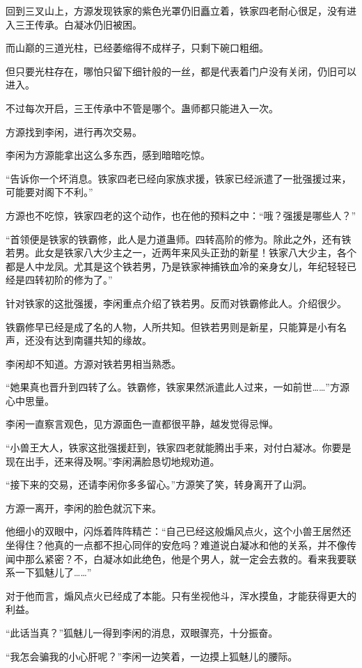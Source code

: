 \begin{this_body}
回到三叉山上，方源发现铁家的紫色光罩仍旧矗立着，铁家四老耐心很足，没有进入三王传承。白凝冰仍旧被困。

而山巅的三道光柱，已经萎缩得不成样子，只剩下碗口粗细。

但只要光柱存在，哪怕只留下细针般的一丝，都是代表着门户没有关闭，仍旧可以进入。

不过每次开启，三王传承中不管是哪个。蛊师都只能进入一次。

方源找到李闲，进行再次交易。

李闲为方源能拿出这么多东西，感到暗暗吃惊。

“告诉你一个坏消息。铁家四老已经向家族求援，铁家已经派遣了一批强援过来，可能要对阁下不利。”

方源也不吃惊，铁家四老的这个动作，也在他的预料之中：“哦？强援是哪些人？”

“首领便是铁家的铁霸修，此人是力道蛊师。四转高阶的修为。除此之外，还有铁若男。此女是铁家八大少主之一，近两年来风头正劲的新星！铁家八大少主，各个都是人中龙凤。尤其是这个铁若男，乃是铁家神捕铁血冷的亲身女儿，年纪轻轻已经是四转初阶的修为了。”

针对铁家的这批强援，李闲重点介绍了铁若男。反而对铁霸修此人。介绍很少。

铁霸修早已经是成了名的人物，人所共知。但铁若男则是新星，只能算是小有名声，还没有达到南疆共知的缘故。

李闲却不知道。方源对铁若男相当熟悉。

“她果真也晋升到四转了么。铁霸修，铁家果然派遣此人过来，一如前世……”方源心中思量。

李闲一直察言观色，见方源面色一直都很平静，越发觉得忌惮。

“小兽王大人，铁家这批强援赶到，铁家四老就能腾出手来，对付白凝冰。你要是现在出手，还来得及啊。”李闲满脸恳切地规劝道。

“接下来的交易，还请李闲你多多留心。”方源笑了笑，转身离开了山洞。

方源一离开，李闲的脸色就沉下来。

他细小的双眼中，闪烁着阵阵精芒：“自己已经这般煽风点火，这个小兽王居然还坐得住？他真的一点都不担心同伴的安危吗？难道说白凝冰和他的关系，并不像传闻中那么紧密？不，白凝冰如此绝色，他是个男人，就一定会去救的。看来我要联系一下狐魅儿了……”

对于他而言，煽风点火已经成了本能。只有坐视他斗，浑水摸鱼，才能获得更大的利益。

“此话当真？”狐魅儿一得到李闲的消息，双眼骤亮，十分振奋。

“我怎会骗我的小心肝呢？”李闲一边笑着，一边摸上狐魅儿的腰际。


\end{this_body}
